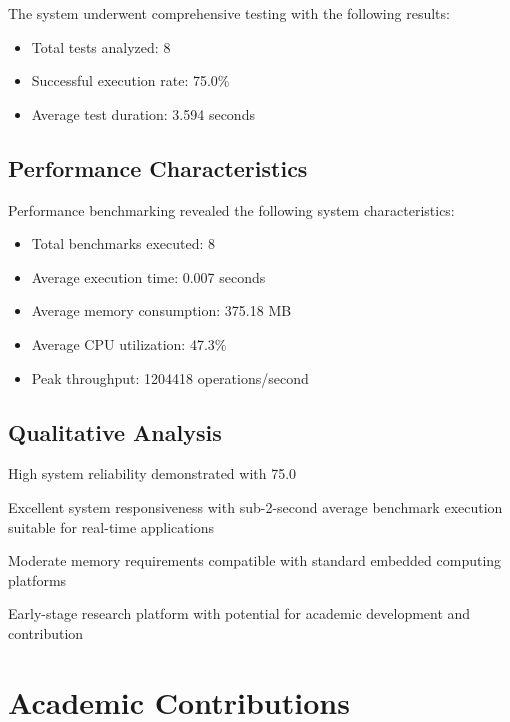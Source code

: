 \documentclass[12pt]{article}
\begin{document}
The system underwent comprehensive testing with the following results:
\begin{itemize}
    \item Total tests analyzed: 8
    \item Successful execution rate: 75.0\%
    \item Average test duration: 3.594 seconds
\end{itemize}


\subsection{Performance Characteristics}

Performance benchmarking revealed the following system characteristics:
\begin{itemize}
    \item Total benchmarks executed: 8
    \item Average execution time: 0.007 seconds
    \item Average memory consumption: 375.18 MB
    \item Average CPU utilization: 47.3\%
    \item Peak throughput: 1204418 operations/second
\end{itemize}


\subsection{Qualitative Analysis}

\item High system reliability demonstrated with 75.0%
\item Excellent system responsiveness with sub-2-second average benchmark execution suitable for real-time applications
\item Moderate memory requirements compatible with standard embedded computing platforms
\item Early-stage research platform with potential for academic development and contribution

\section{Academic Contributions}
\end{document}
